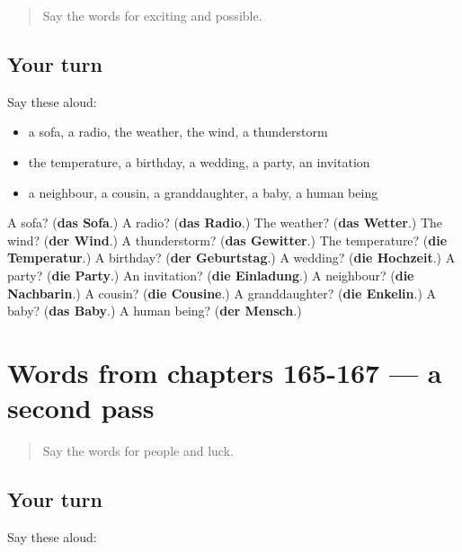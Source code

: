 \label{lesson:GE-R167-first-pass-words-from-chapters-162-164}



\begin{quote}
Say the words for exciting and possible.
\end{quote}

\subsection*{Your turn}
Say these aloud:

\begin{itemize}
\raggedright
  \item a sofa, a radio, the weather, the wind, a thunderstorm
  \item the temperature, a birthday, a wedding, a party, an invitation
  \item a neighbour, a cousin, a granddaughter, a baby, a human being
\end{itemize}

\begin{tcolorbox}[breakable,colback=teal!4,colframe=teal!35!black,title={Before you move on}]
A sofa? (\textbf{das Sofa}.) A radio? (\textbf{das Radio}.) The weather? (\textbf{das Wetter}.) The wind? (\textbf{der Wind}.) A thunderstorm? (\textbf{das Gewitter}.) The temperature? (\textbf{die Temperatur}.) A birthday? (\textbf{der Geburtstag}.) A wedding? (\textbf{die Hochzeit}.) A party? (\textbf{die Party}.) An invitation? (\textbf{die Einladung}.) A neighbour? (\textbf{die Nachbarin}.) A cousin? (\textbf{die Cousine}.) A granddaughter? (\textbf{die Enkelin}.) A baby? (\textbf{das Baby}.) A human being? (\textbf{der Mensch}.)
\end{tcolorbox}
\section[(dialogue)]{Words from chapters 165-167 — a second pass}

\label{lesson:GE-R167-second-pass-words-from-chapters-165-167}



\begin{quote}
Say the words for people and luck.
\end{quote}

\subsection*{Your turn}
Say these aloud:

